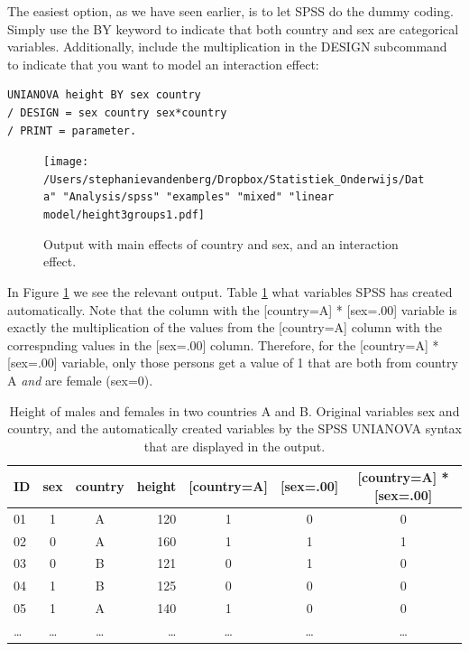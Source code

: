 \documentclass[]{book}\usepackage[]{graphicx}\usepackage[]{color}
\begin{document}
The easiest option, as we have seen earlier, is to let SPSS do the dummy coding. Simply use the BY keyword to indicate that both country and sex are categorical variables. Additionally, include the multiplication in the DESIGN subcommand to indicate that you want to model an interaction effect:

\begin{verbatim}
UNIANOVA height BY sex country 
/ DESIGN = sex country sex*country
/ PRINT = parameter.
\end{verbatim}


\begin{figure}[h]
    \begin{center}
       \texttt{[image: /Users/stephanievandenberg/Dropbox/Statistiek\_Onderwijs/Data" "Analysis/spss" "examples" "mixed" "linear model/height3groups1.pdf]}
    \end{center}
    \label{fig:interactionheightcountrysex}
    \caption{Output with main effects of country and sex, and an interaction effect.}
\end{figure}

In Figure \ref{fig:interactionheightcountrysex} we see the relevant output. Table \ref{tab:2countries} what variables SPSS has created automatically. Note that the column with the [country=A] * [sex=.00] variable is exactly the multiplication of the values from the [country=A] column with the correspnding values in the [sex=.00] column. Therefore, for the [country=A] * [sex=.00] variable, only those persons get a value of 1 that are both from country A \textit{and} are female (sex=0). 


\begin{table}
 \caption{Height of males and females in two countries A and B. Original variables sex and country, and the automatically created variables by the SPSS UNIANOVA syntax that are displayed in the output.}
 \begin{tabular}{lccrccc}
 ID & sex & country & height &  [country=A] & [sex=.00] &[country=A] * [sex=.00]      \\ \hline
 01 & 1 & A & 120 &  1 &0 & 0         \\
 02 & 0 & A & 160 &   1&1 & 1        \\
 03 & 0 & B & 121 &  0 &1& 0       \\
 04 & 1 & B & 125 &  0 &0 &0          \\
 05 & 1 & A & 140 &  1 &0 & 0       \\
 \dots & \dots & \dots & \dots &\dots   & \dots&  \dots       \\
 \end{tabular}
 \label{tab:2countries}
 \end{table}
\end{document}
